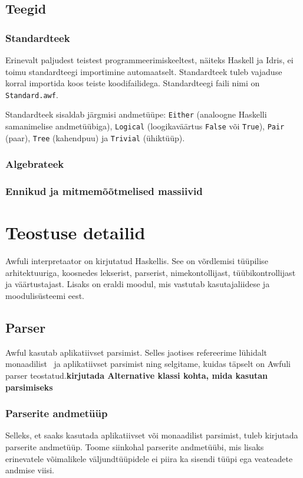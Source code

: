 \documentclass[12pt]{article}
\newcommand\peatykk[1]{
  \clearpage
  \section{#1}}
\newcommand\markus[1]{\textcolor{roheline}{\textbf{#1}}}
\begin{document}
    \subsection{Teegid}
      
      \subsubsection{Standardteek}
        Erinevalt paljudest teistest programmeerimiskeeltest, näiteks Haskell ja Idris, ei toimu standardteegi importimine automaatselt. Standardteek tuleb vajaduse korral importida koos teiste koodifailidega. Standardteegi faili nimi on \verb!Standard.awf!.

        Standardteek sisaldab järgmisi andmetüüpe: \verb!Either! (analoogne Haskelli samanimelise andmetüübiga),  \verb!Logical! (loogikaväärtus \verb!False! või \verb!True!), \verb!Pair! (paar), \verb!Tree! (kahendpuu) ja \verb!Trivial! (ühiktüüp).
      \subsubsection{Algebrateek}
        
      \subsubsection{Ennikud ja mitmemõõtmelised massiivid}
        
  \peatykk{Teostuse detailid}
    Awfuli interpretaator on kirjutatud Haskellis. See on võrdlemisi tüüpilise arhitektuuriga, koosnedes lekserist, parserist, nimekontollijast, tüübikontrollijast ja väärtustajast. Lisaks on eraldi moodul, mis vastutab kasutajaliidese ja moodulisüsteemi eest.
    \subsection{Parser}
      Awful kasutab aplikatiivset parsimist. Selles jaotises refereerime lühidalt monaadilist~\cite{Mon} ja aplikatiivset parsimist ning selgitame, kuidas täpselt on Awfuli parser teostatud.\markus{kirjutada Alternative klassi kohta, mida kasutan parsimiseks}
      \subsubsection{Parserite andmetüüp}\label{parserityyp}
        Selleks, et saaks kasutada aplikatiivset või monaadilist parsimist, tuleb kirjutada parserite andmetüüp. Toome siinkohal parserite andmetüübi, mis lisaks erinevatele võimalikele väljundtüüpidele ei piira ka sisendi tüüpi ega veateadete andmise viisi.
\end{document}
